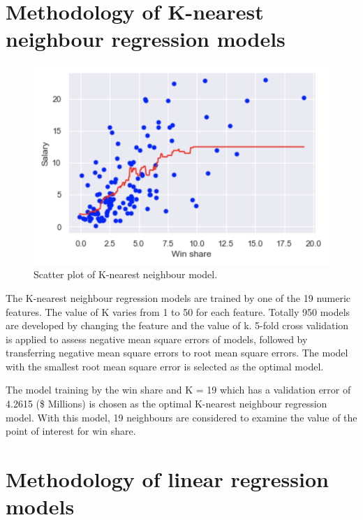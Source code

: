 \documentclass[letterpaper,12pt,twoside,]{pinp}
\begin{document}
\hypertarget{methodology-of-k-nearest-neighbour-regression-models}{%
\section{Methodology of K-nearest neighbour regression
models}\label{methodology-of-k-nearest-neighbour-regression-models}}

\begin{figure}
\includegraphics[width=1\linewidth]{knn_plot.png}
\centering
\caption{Scatter plot of K-nearest neighbour model.}
\label{fig:knn}
\end{figure}

The K-nearest neighbour regression models are trained by one of the 19
numeric features. The value of K varies from 1 to 50 for each feature.
Totally 950 models are developed by changing the feature and the value
of k. 5-fold cross validation is applied to assess negative mean square
errors of models, followed by transferring negative mean square errors
to root mean square errors. The model with the smallest root mean square
error is selected as the optimal model.

The model training by the win share and K = 19 which has a validation
error of 4.2615 (\$ Millions) is chosen as the optimal K-nearest
neighbour regression model. With this model, 19 neighbours are
considered to examine the value of the point of interest for win share.

\hypertarget{methodology-of-linear-regression-models}{%
\section{Methodology of linear regression
models}\label{methodology-of-linear-regression-models}}
\end{document}
